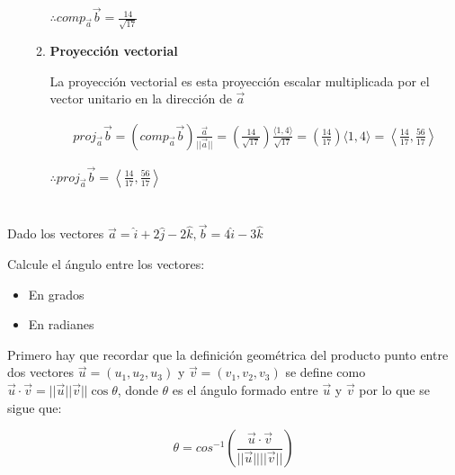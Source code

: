 \documentclass[12pt]{article}
\begin{document}
\begin{itemize}
\begin{enumerate}[format=\textbf]
    $\therefore comp_{\vec{a}}\vec{b} = \frac{14}{\sqrt{17}}$

  \item \textbf{Proyección vectorial}

    La proyección vectorial es esta proyección escalar multiplicada por el vector unitario en la dirección de $\vec{a}$

    \begin{align*}
      proj_{\vec{a}}\vec{b}
      = \left( comp_{\vec{a}}\vec{b} \right) \frac{\vec{a}}{||\vec{a}||}
      = \left( \frac{14}{\sqrt{17}} \right) \frac{\langle 1, 4 \rangle}{\sqrt{17}}
      = \left( \frac{14}{17} \right) \langle 1, 4 \rangle
      = \left\langle \frac{14}{17}, \frac{56}{17} \right\rangle
    \end{align*}

    $\therefore proj_{\vec{a}}\vec{b} = \left\langle  \frac{14}{17}, \frac{56}{17} \right\rangle$
    
  \end{enumerate}
  
\end{itemize}

\section{}

Dado los vectores $\vec{a} = \hat{i} + 2\hat{j}-2\hat{k}, \vec{b} = 4\hat{i} -3\hat{k}$

Calcule el ángulo entre los vectores:

\begin{itemize}

\item En grados

\item En radianes

\end{itemize}

Primero hay que recordar que la definición geométrica del producto punto entre dos vectores $\vec{u} = (u_1, u_2, u_3)$ y  $\vec{v} = (v_1, v_2, v_3)$ se define como  $\vec{u} \cdot \vec{v} = ||\vec{u} || \vec{v}|| \cos{\theta}$, donde $\theta$ es el ángulo formado entre $\vec{u}$ y $\vec{v}$  por lo que se sigue que:

\[
\theta = cos^{-1 }\left(\frac{\vec{u} \cdot \vec{v}}{||\vec{u}|| ||\vec{v}||}\right)
\]
\end{document}
